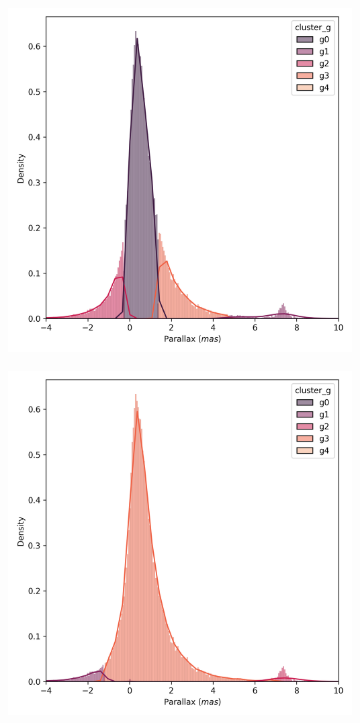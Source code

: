 \documentclass[preprint,12pt,authoryear]{elsarticle}
\begin{document}
\begin{figure}[!hbt]
  \begin{subfigure}{0.29\textwidth}
    \includegraphics[width=\textwidth]{../figures/melotte_22/kmeans_parallax_melotte_22.png}
  \end{subfigure}
  \begin{subfigure}{0.29\textwidth}
    \includegraphics[width=\textwidth]{../figures/melotte_22/dec_parallax_melotte_22.png}

\end{subfigure}
\end{figure}
\end{document}
